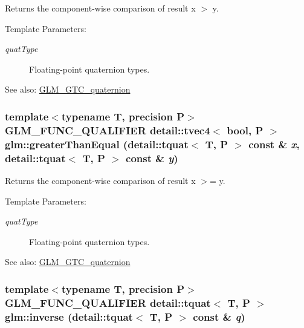 Returns the component-wise comparison of result x $>$ y.

\begin{Desc}
\item[Template Parameters:]
\begin{description}
\item[{\em quatType}]Floating-point quaternion types.\end{description}
\end{Desc}
\begin{Desc}
\item[See also:]\hyperlink{group__gtc__quaternion}{GLM\_\-GTC\_\-quaternion} \end{Desc}
\hypertarget{group__gtc__quaternion_ge52fe15caa6daaf39c02a5d5827f8473}{
\subsubsection[greaterThanEqual]{\setlength{\rightskip}{0pt plus 5cm}template$<$typename T, precision P$>$ GLM\_\-FUNC\_\-QUALIFIER detail::tvec4$<$ bool, P $>$ glm::greaterThanEqual (detail::tquat$<$ T, P $>$ const \& {\em x}, \/  detail::tquat$<$ T, P $>$ const \& {\em y})}}
\label{group__gtc__quaternion_ge52fe15caa6daaf39c02a5d5827f8473}


Returns the component-wise comparison of result x $>$= y.

\begin{Desc}
\item[Template Parameters:]
\begin{description}
\item[{\em quatType}]Floating-point quaternion types.\end{description}
\end{Desc}
\begin{Desc}
\item[See also:]\hyperlink{group__gtc__quaternion}{GLM\_\-GTC\_\-quaternion} \end{Desc}
\hypertarget{group__gtc__quaternion_g105dc7d1f84cc6cf4ba6e3634c671688}{
\subsubsection[inverse]{\setlength{\rightskip}{0pt plus 5cm}template$<$typename T, precision P$>$ GLM\_\-FUNC\_\-QUALIFIER detail::tquat$<$ T, P $>$ glm::inverse (detail::tquat$<$ T, P $>$ const \& {\em q})}}
\label{group__gtc__quaternion_g105dc7d1f84cc6cf4ba6e3634c671688}


